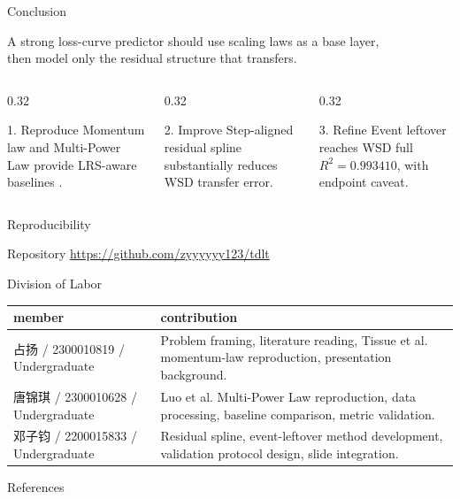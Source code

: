 \documentclass[fontset=fandol,aspectratio=169,10pt]{ctexbeamer}
\newcommand{\MemberA}{占扬 / 2300010819 / Undergraduate}
\newcommand{\MemberB}{唐锦琪 / 2300010628 / Undergraduate}
\newcommand{\MemberC}{邓子钧 / 2200015833 / Undergraduate}
\newcommand{\RepoURL}{\url{https://github.com/zyyyyyy123/tdlt}}
\begin{document}
\begin{frame}{Conclusion}
  \begin{center}
    \Large
    A strong loss-curve predictor should use scaling laws as a base layer,\\
    then model only the residual structure that transfers.
  \end{center}
  \vspace{0.9em}
  \begin{columns}[T,onlytextwidth]
    \begin{column}{0.32\textwidth}
      \begin{block}{1. Reproduce}
        Momentum law and Multi-Power Law provide LRS-aware baselines
        \cite{luo2025multi,tissue2026scaling}.
      \end{block}
    \end{column}
    \begin{column}{0.32\textwidth}
      \begin{block}{2. Improve}
        Step-aligned residual spline substantially reduces WSD transfer error.
      \end{block}
    \end{column}
    \begin{column}{0.32\textwidth}
      \begin{block}{3. Refine}
        Event leftover reaches WSD full \(R^2=0.993410\), with endpoint caveat.
      \end{block}
    \end{column}
  \end{columns}
\end{frame}

\begin{frame}{Reproducibility}
  \begin{block}{Repository}
    \RepoURL
  \end{block}
\end{frame}

\begin{frame}{Division of Labor}
  \begin{table}
    \centering
    \scriptsize
    \begin{tabularx}{0.96\textwidth}{lX}
      \toprule
      member & contribution\\
      \midrule
      \MemberA & Problem framing, literature reading, Tissue et al. momentum-law reproduction, presentation background.\\
      \MemberB & Luo et al. Multi-Power Law reproduction, data processing, baseline comparison, metric validation.\\
      \MemberC & Residual spline, event-leftover method development, validation protocol design, slide integration.\\
      \bottomrule
    \end{tabularx}
  \end{table}
\end{frame}

\begin{frame}[allowframebreaks]{References}
  \tiny
  
\end{frame}
\end{document}

